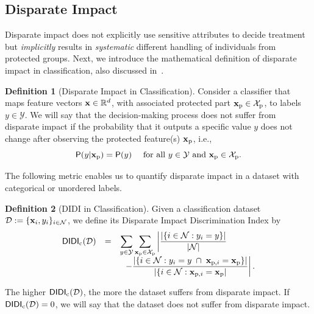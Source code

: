 \documentclass[letterpaper]{article} %
\theoremstyle{definition}
\newtheorem{definition}{Definition}[section]
\newcommand{\1}{\ensuremath{{\rm e}}} %
\newcommand{\PR}{\ensuremath{\mathsf{P}}} %
\newcommand{\prx}{{\bf x}_{\rm p}}
\newcommand{\prxi}{{\bf{x}}_{{\rm{p}},i}}
\newcommand{\prX}{{\mathcal X}_{\rm p}}
\begin{document}

\subsection{Disparate Impact}

Disparate impact does not explicitly use sensitive attributes to decide treatment but \emph{implicitly} results in \emph{systematic} different handling of individuals from protected groups. Next, we introduce the mathematical definition of disparate impact in classification, also discussed in~\cite{bilalzafar2017fairness,barocas2016big}.

\begin{definition}[Disparate Impact in Classification] Consider a classifier that maps feature vectors ${\bf x} \in \mathbb R^d$, with associated protected part $\prx \in \prX$, to labels $y \in \mathcal Y$. We will say that the decision-making process does not suffer from disparate impact if the probability that it outputs a specific value $y$ does not change after observing the protected feature(s) $\prx$, i.e.,
\begin{equation}
\PR( y |  \prx ) = \PR( y ) \quad \text{ for all } y \in \mathcal Y \text { and } \prx \in \prX.
\label{eq:disparate_impact_classification}
\end{equation}
\label{def:disparate_impact_classification}
\end{definition}
%
The following metric enables us to quantify disparate impact in a dataset with categorical or unordered labels.
\begin{definition}[DIDI in Classification] Given a classification dataset $\mathcal D:= \{ {\bf x}_i, y_i \}_{i\in \mathcal N}$, we define its Disparate Impact Discrimination Index by
\begin{equation*}
\begin{array}{ccl}
{\mathsf{DIDI}}_{\rm c}({\mathcal D}) & = & \displaystyle \sum_{y \in \mathcal Y} \sum_{\prx \in \prX} \left| 
\frac{ \left| \{ i \in \mathcal N : y_i=y   \} \right| }{ | \mathcal N | } 
\right. \\ 
&& \left. \;\; -
\displaystyle \frac{ \left| \{ i \in \mathcal N : y_i=y \; \cap \; \prxi = \prx   \} \right| }{ \left| \{ i \in \mathcal N : \prxi = \prx \right| } 
\right|.
\end{array}
\end{equation*}

The higher ${\mathsf{DIDI}}_{\rm c}({\mathcal D})$, the more the dataset suffers from disparate impact. If ${\mathsf{DIDI}}_{\rm c}({\mathcal D}) = 0$, we will say that the dataset does not suffer from disparate impact.
\label{def:DIDIc}
\end{definition}
\end{document}
